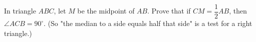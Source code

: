 In triangle $ABC$, let $M$ be the midpoint of $AB$. Prove that if $CM=\dfrac{1}{2}AB$, then $\angle ACB=90^\circ$. (So "the median to a side equals half that side" is a test for a right triangle.)
